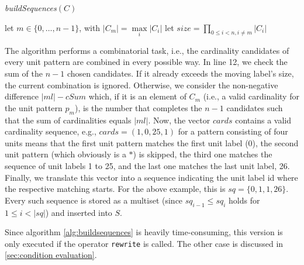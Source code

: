 \documentclass{sig-alternate}
\newcommand{\ic}[1]{\textit{#1}}
\begin{document}
\begin{algorithm}[ht]
  \caption{\label{alg:buildsequences}\ic{buildSequences$(C)$}}
    let $m\in \{0,\dots,n-1\}$, with $\left|C_m\right|=\max\limits_i \left|C_i\right|$\;
    let $size=\prod_{0\leq i<n,i\neq m}\left|C_i\right|$\;
\end{algorithm}

The algorithm performs a combinatorial task, i.e., the cardinality candidates of every unit pattern are combined in every possible way. In line 12, we check the sum of the $n-1$ chosen candidates. If it already exceeds the moving label's size, the current combination is ignored. Otherwise, we consider the non-negative difference $\left|ml\right|-cSum$ which, if it is an element of $C_m$ (i.e., a valid cardinality for the unit pattern $p_m$), is the number that completes the $n-1$ candidates such that the sum of cardinalities equals $\left|ml\right|$. Now, the vector $cards$ contains a valid cardinality sequence, e.g., $cards=(1,0,25,1)$ for a pattern consisting of four units means that the first unit pattern matches the first unit label (0), the second unit pattern (which obviously is a $\ast$) is skipped, the third one matches the sequence of unit labels 1 to 25, and the last one matches the last unit label, 26. Finally, we translate this vector into a sequence indicating the unit label id where the respective matching starts. For the above example, this is $sq=\{0,1,1,26\}$. Every such sequence is stored as a multiset (since $sq_{i-1}\leq sq_i$ holds for $1\leq i<\left|sq\right|$) and inserted into $S$.

Since algorithm \ref{alg:buildsequences} is heavily time-consuming, this version is only executed if the operator \texttt{rewrite} is called. The other case is discussed in \ref{sec:condition evaluation}.
\end{document}
